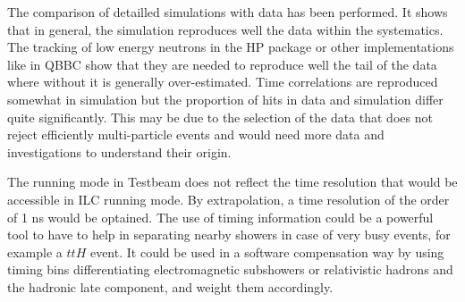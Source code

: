 The comparison of detailled simulations with data has been performed. It shows that in general, the simulation reproduces well the data within the systematics. The tracking of low energy neutrons in the HP package or other implementations like in QBBC show that they are needed to reproduce well the tail of the data where without it is generally over-estimated. Time correlations are reproduced somewhat in simulation but the proportion of hits in data and simulation differ quite significantly. This may be due to the selection of the data that does not reject efficiently multi-particle events and would need more data and investigations to understand their origin.

The running mode in Testbeam does not reflect the time resolution that would be accessible in ILC running mode. By extrapolation, a time resolution of the order of 1 ns would be optained. The use of timing information could be a powerful tool to have to help in separating nearby showers in case of very busy events, for example a $ttH$ event. It could be used in a software compensation way by using timing bins differentiating electromagnetic subshowers or relativistic hadrons and the hadronic late component, and weight them accordingly.

